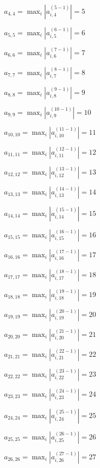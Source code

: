 \documentclass[a4paper,12pt]{article}
\begin{document}
$a _{ 4, 4 } =  \max _i |a _{ i, 4 } ^{ (5 - 1) } | = 5$

$a _{ 5, 5 } =  \max _i |a _{ i, 5 } ^{ (6 - 1) } | = 6$

$a _{ 6, 6 } =  \max _i |a _{ i, 6 } ^{ (7 - 1) } | = 7$

$a _{ 7, 7 } =  \max _i |a _{ i, 7 } ^{ (8 - 1) } | = 8$

$a _{ 8, 8 } =  \max _i |a _{ i, 8 } ^{ (9 - 1) } | = 9$

$a _{ 9, 9 } =  \max _i |a _{ i, 9 } ^{ (10 - 1) } | = 10$

$a _{ 10, 10 } =  \max _i |a _{ i, 10 } ^{ (11 - 1) } | = 11$

$a _{ 11, 11 } =  \max _i |a _{ i, 11 } ^{ (12 - 1) } | = 12$

$a _{ 12, 12 } =  \max _i |a _{ i, 12 } ^{ (13 - 1) } | = 13$

$a _{ 13, 13 } =  \max _i |a _{ i, 13 } ^{ (14 - 1) } | = 14$

$a _{ 14, 14 } =  \max _i |a _{ i, 14 } ^{ (15 - 1) } | = 15$

$a _{ 15, 15 } =  \max _i |a _{ i, 15 } ^{ (16 - 1) } | = 16$

$a _{ 16, 16 } =  \max _i |a _{ i, 16 } ^{ (17 - 1) } | = 17$

$a _{ 17, 17 } =  \max _i |a _{ i, 17 } ^{ (18 - 1) } | = 18$

$a _{ 18, 18 } =  \max _i |a _{ i, 18 } ^{ (19 - 1) } | = 19$

$a _{ 19, 19 } =  \max _i |a _{ i, 19 } ^{ (20 - 1) } | = 20$

$a _{ 20, 20 } =  \max _i |a _{ i, 20 } ^{ (21 - 1) } | = 21$

$a _{ 21, 21 } =  \max _i |a _{ i, 21 } ^{ (22 - 1) } | = 22$

$a _{ 22, 22 } =  \max _i |a _{ i, 22 } ^{ (23 - 1) } | = 23$

$a _{ 23, 23 } =  \max _i |a _{ i, 23 } ^{ (24 - 1) } | = 24$

$a _{ 24, 24 } =  \max _i |a _{ i, 24 } ^{ (25 - 1) } | = 25$

$a _{ 25, 25 } =  \max _i |a _{ i, 25 } ^{ (26 - 1) } | = 26$

$a _{ 26, 26 } =  \max _i |a _{ i, 26 } ^{ (27 - 1) } | = 27$
\end{document}

